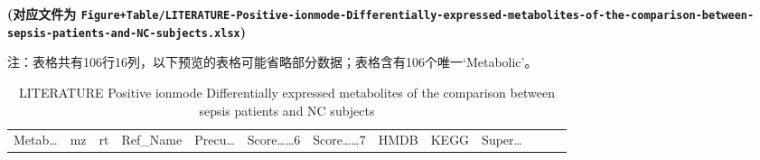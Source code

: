 \documentclass[
]{article}
\begin{document}
\textbf{(对应文件为 \texttt{Figure+Table/LITERATURE-Positive-ionmode-Differentially-expressed-metabolites-of-the-comparison-between-sepsis-patients-and-NC-subjects.xlsx})}

\begin{center}\begin{tcolorbox}[colback=gray!10, colframe=gray!50, width=0.9\linewidth, arc=1mm, boxrule=0.5pt]注：表格共有106行16列，以下预览的表格可能省略部分数据；表格含有106个唯一`Metabolic'。
\end{tcolorbox}
\end{center}

\begin{longtable}[]{@{}lllllllllllll@{}}
\caption{\label{tab:LITERATURE-Positive-ionmode-Differentially-expressed-metabolites-of-the-comparison-between-sepsis-patients-and-NC-subjects}LITERATURE Positive ionmode Differentially expressed metabolites of the comparison between sepsis patients and NC subjects}\tabularnewline
\toprule
\begin{minipage}[b]{0.05\columnwidth}\raggedright
Metab\ldots{}\strut
\end{minipage} & \begin{minipage}[b]{0.05\columnwidth}\raggedright
mz\strut
\end{minipage} & \begin{minipage}[b]{0.05\columnwidth}\raggedright
rt\strut
\end{minipage} & \begin{minipage}[b]{0.05\columnwidth}\raggedright
Ref\_Name\strut
\end{minipage} & \begin{minipage}[b]{0.05\columnwidth}\raggedright
Precu\ldots{}\strut
\end{minipage} & \begin{minipage}[b]{0.07\columnwidth}\raggedright
Score\ldots\ldots6\strut
\end{minipage} & \begin{minipage}[b]{0.07\columnwidth}\raggedright
Score\ldots\ldots7\strut
\end{minipage} & \begin{minipage}[b]{0.05\columnwidth}\raggedright
HMDB\strut
\end{minipage} & \begin{minipage}[b]{0.04\columnwidth}\raggedright
KEGG\strut
\end{minipage} & \begin{minipage}[b]{0.05\columnwidth}\raggedright
Super\ldots{}\strut
\end{minipage} & \begin{minipage}[b]{0.05\columnwidth}\raggedright

\end{minipage}
\end{longtable}
\end{document}
